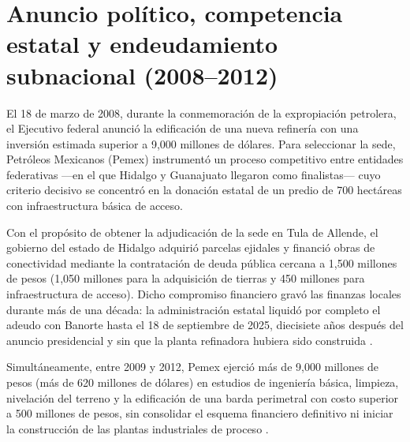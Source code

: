 

\section{Anuncio político, competencia estatal y endeudamiento subnacional (2008--2012)}

El 18 de marzo de 2008, durante la conmemoración de la expropiación petrolera, el Ejecutivo federal anunció la edificación de una nueva refinería con una inversión estimada superior a 9,000 millones de dólares. Para seleccionar la sede, Petróleos Mexicanos (Pemex) instrumentó un proceso competitivo entre entidades federativas ---en el que Hidalgo y Guanajuato llegaron como finalistas--- cuyo criterio decisivo se concentró en la donación estatal de un predio de 700 hectáreas con infraestructura básica de acceso.

Con el propósito de obtener la adjudicación de la sede en Tula de Allende, el gobierno del estado de Hidalgo adquirió parcelas ejidales y financió obras de conectividad mediante la contratación de deuda pública cercana a 1,500 millones de pesos (1,050 millones para la adquisición de tierras y 450 millones para infraestructura de acceso). Dicho compromiso financiero gravó las finanzas locales durante más de una década: la administración estatal liquidó por completo el adeudo con Banorte hasta el 18 de septiembre de 2025, diecisiete años después del anuncio presidencial y sin que la planta refinadora hubiera sido construida \citep{periodicohidalgo2025}.

Simultáneamente, entre 2009 y 2012, Pemex ejerció más de 9,000 millones de pesos (más de 620 millones de dólares) en estudios de ingeniería básica, limpieza, nivelación del terreno y la edificación de una barda perimetral con costo superior a 500 millones de pesos, sin consolidar el esquema financiero definitivo ni iniciar la construcción de las plantas industriales de proceso \citep{asf2015,asf2016,raziel2021}.

